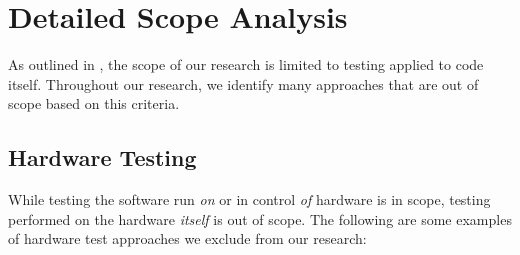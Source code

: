 \chapter{Detailed Scope Analysis}\label{app-scope}

As outlined in , the scope of our research is limited to
testing applied to code itself. Throughout our research, we identify many
approaches that are out of scope based on this criteria.

\section{Hardware Testing}\label{hard-test}
While testing the software run \emph{on} or in control \emph{of} hardware is in
scope, testing performed on the hardware \emph{itself} is out of scope. The
following are some examples of hardware test approaches we exclude from our
research:

